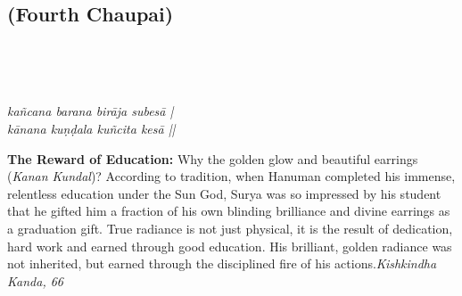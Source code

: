
\newpage

\subsection*{ (Fourth Chaupai)}

\begin{minipage}[t]{0.55\textwidth}
\vspace{0pt}

{\large \linespread{1.5}\selectfont
{}\\
\par}

\vspace{0.5em}

{\large \linespread{1.5}\selectfont
{}\\
\par}

\vspace{0.5em}

{\large \linespread{1.3}\selectfont
\textit{kañcana barana birāja subesā |}\\
\textit{kānana kuṇḍala kuñcita kesā ||}
\par}
\end{minipage}%
\hfill
\begin{minipage}[t]{0.42\textwidth}
\vspace{0pt}
\begin{tcolorbox}[anchorbox]
\textbf{The Reward of Education:} Why the golden glow and beautiful earrings (\textit{Kanan Kundal})? According to tradition, when Hanuman completed his immense, relentless education under the Sun God, Surya was so impressed by his student that he gifted him a fraction of his own blinding brilliance and divine earrings as a graduation gift. True radiance is not just physical, it is the result of dedication, hard work and earned through good education.
\vspace{0.5em}\newline His brilliant, golden radiance was not inherited, but earned through the disciplined fire of his actions.\newline\null\hfill\textit{Kishkindha Kanda, 66}
\end{tcolorbox}
\end{minipage}

